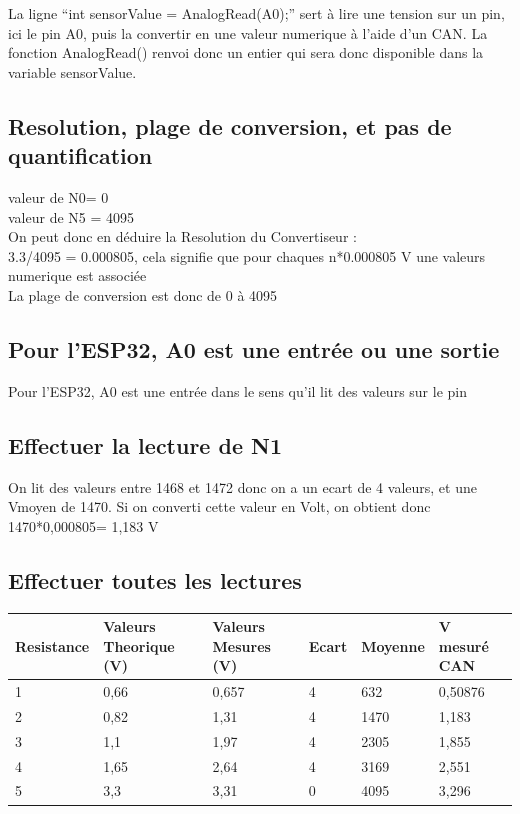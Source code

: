 \documentclass[10pt,a4paper]{article}
\begin{document}
La ligne ``int sensorValue = AnalogRead(A0);'' sert à lire une tension sur un pin, ici le pin A0, puis la convertir en une valeur numerique à l'aide d'un CAN.
La fonction AnalogRead() renvoi donc un entier qui sera donc disponible dans la variable sensorValue.
\subsection{Resolution, plage de conversion, et pas de quantification}
valeur de N0= 0\\
valeur de N5 = 4095\\
On peut donc en déduire la Resolution du Convertiseur :\\
3.3/4095 = 0.000805, cela signifie que pour chaques n*0.000805 V une valeurs numerique est associée \\

La plage de conversion est donc de 0 à 4095 \\
\subsection{Pour l'ESP32, A0 est une entrée ou une sortie}
Pour l'ESP32, A0 est une entrée dans le sens qu'il lit des valeurs sur le pin

\subsection{Effectuer la lecture de N1}
On lit des valeurs entre 1468 et 1472 donc on a un ecart de 4 valeurs, et une Vmoyen de 1470. Si on converti cette valeur en Volt, on obtient donc 1470*0,000805= 1,183 V\\
\subsection{Effectuer toutes les lectures}
\begin{tabular}{|l|l|l|l|l|l|}
\hline
    Resistance & Valeurs Theorique (V) & Valeurs Mesures (V) & Ecart & Moyenne & V mesuré CAN \\ \hline
    1 & 0,66 & 0,657 & 4 & 632 & 0,50876 \\ \hline
    2 & 0,82 & 1,31 & 4 & 1470 & 1,183\\ \hline
    3 & 1,1 & 1,97 & 4 & 2305 & 1,855\\ \hline
    4 & 1,65 & 2,64 & 4 & 3169 &  2,551\\ \hline
    5 & 3,3 & 3,31 & 0 & 4095  &  3,296\\ \hline
    
\hline
\end{tabular}
\end{document}

